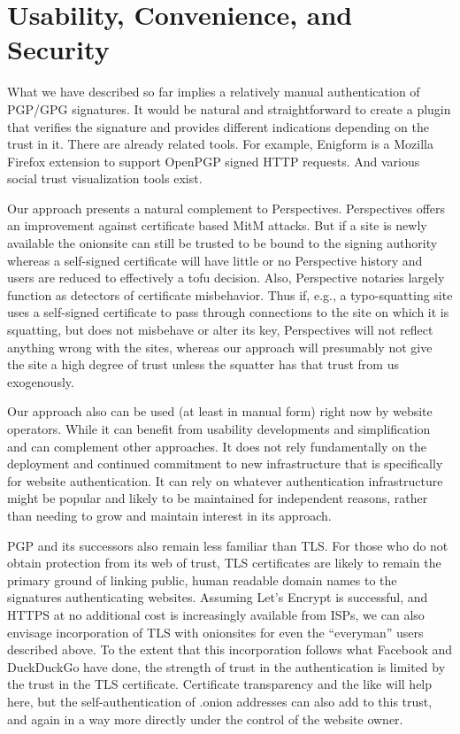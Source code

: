 \documentclass[10pt, conference, compsocconf]{styles/IEEEtran}
\begin{document}
\section{Usability, Convenience, and Security}

What we have described so far implies a relatively manual
authentication of PGP/GPG signatures. It would be natural and
straightforward to create a plugin that verifies the signature
and provides different indications depending on the trust in it.
There are already related tools. For example, Enigform is a
Mozilla Firefox extension to support OpenPGP signed HTTP requests.
And various social trust visualization tools exist.

Our approach presents a natural complement to Perspectives.
Perspectives offers an improvement against
certificate based MitM attacks. But if a site is newly available
the onionsite can still be trusted to be bound to the signing
authority whereas a self-signed certificate will have little or no
Perspective history and users are reduced to effectively a tofu
decision. Also, Perspective notaries largely function as
detectors of certificate misbehavior. 
Thus if, e.g., a typo-squatting site uses a self-signed certificate to
pass through connections to the site on which it is squatting, but
does not misbehave or alter its key, Perspectives will not reflect
anything wrong with the sites, whereas our approach will presumably
not give the site a high degree of trust unless the squatter has
that trust from us exogenously.

Our approach also can be used (at least in manual form) right now by
website operators. While it can benefit from usability developments
and simplification and can complement other approaches. It does not
rely fundamentally on the deployment and continued commitment to new
infrastructure that is specifically for website authentication.  It
can rely on whatever authentication infrastructure might be popular
and likely to be maintained for independent reasons, rather than
needing to grow and maintain interest in its approach.

PGP and its successors also remain less familiar than TLS. For those
who do not obtain protection from its web of trust, TLS certificates
are likely to remain the primary ground of linking public, human
readable domain names to the signatures authenticating
websites. Assuming Let's Encrypt is successful, and HTTPS at no
additional cost is increasingly available from ISPs, we can also
envisage incorporation of TLS with onionsites for even the
``everyman'' users described above.  To the extent that this
incorporation follows what Facebook and DuckDuckGo have done, the
strength of trust in the authentication is limited by the trust in the
TLS certificate. Certificate transparency and the
like will help here, but the self-authentication of .onion addresses
can also add to this trust, and again in a way more directly under the
control of the website owner.
\end{document}
